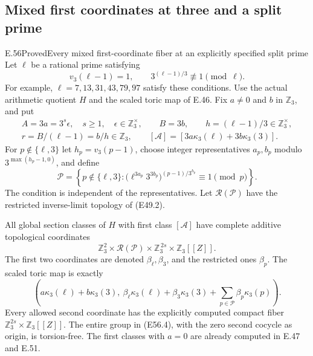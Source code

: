 \subsection{Mixed first coordinates at three and a split prime}

\begin{statement}{E.56}{Proved}{Every mixed first-coordinate fiber at an explicitly specified split prime}
Let $\ell$ be a rational prime satisfying
\[
       v_3(\ell-1)=1,\qquad
                 3^{(\ell-1)/3}\not\equiv1\pmod\ell .
 \tag{E56.1}
\]
For example, $\ell=7,13,31,43,79,97$ satisfy these conditions.
Use the actual arithmetic quotient $H$ and the scaled toric
map of E.46. Fix $a\ne0$ and $b$ in $\mathbb Z_3$, and put
\[
 \begin{gathered}
 A=3a=3^s\epsilon,\quad s\ge1,\quad\epsilon\in\mathbb Z_3^\times,
 \qquad B=3b,\qquad h=(\ell-1)/3\in\mathbb Z_3^\times,\\
 r=B/(\ell-1)=b/h\in\mathbb Z_3,\qquad
 [\mathcal A]=[3a\kappa_3(\ell)+3b\kappa_3(3)].
 \end{gathered}
 \tag{E56.2}
\]
For $p\notin\{\ell,3\}$ let $h_p=v_3(p-1)$, choose
integer representatives $a_p,b_p$ modulo
$3^{\max(h_p-1,0)}$, and define
\[
 \mathscr P=
 \left\{p\notin\{\ell,3\}:
       \bigl(\ell^{3a_p}3^{3b_p}\bigr)^{(p-1)/3^{h_p}}
                                     \equiv1\pmod p\right\}.
 \tag{E56.3}
\]
The condition is independent of the representatives.
Let $\mathcal R(\mathscr P)$ have the restricted
inverse-limit topology of (E49.2).

All global section classes of $H$ with first class
$[\mathcal A]$ have complete additive topological coordinates
\[
 \boxed{\qquad
 \mathbb Z_3^2\times\mathcal R(\mathscr P)
                    \times\mathbb Z_3^{\,2s}\times\mathbb Z_3[[Z]].
 \qquad}
 \tag{E56.4}
\]
The first two coordinates are denoted $\beta_\ell,\beta_3$,
and the restricted ones $\beta_p$. The scaled toric map is
exactly
\[
 \left(a\kappa_3(\ell)+b\kappa_3(3),\
   \beta_\ell\kappa_3(\ell)+\beta_3\kappa_3(3)
                      +\sum_{p\in\mathscr P}\beta_p\kappa_3(p)\right).
 \tag{E56.5}
\]
Every allowed second coordinate has the explicitly
computed compact fiber
$\mathbb Z_3^{2s}\times\mathbb Z_3[[Z]]$.
The entire group in (E56.4), with the zero second
cocycle as origin, is torsion-free.
The first classes with $a=0$ are already computed
in E.47 and E.51.


\end{statement}
